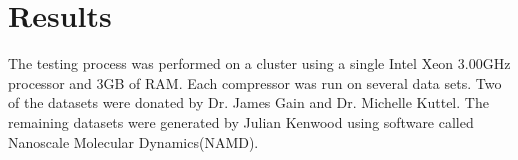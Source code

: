 \documentclass[a4paper,11pt]{report}
\begin{document}
% 
% 
% 
% 
% 

 

\chapter{Results}

The testing process was performed on a cluster using a single Intel Xeon 3.00GHz processor and 3GB of RAM. Each compressor was run on several data sets. Two of the datasets were donated by Dr. James Gain and Dr. Michelle Kuttel. The remaining datasets were generated by Julian Kenwood using software called Nanoscale Molecular Dynamics(NAMD). 
\end{document}
